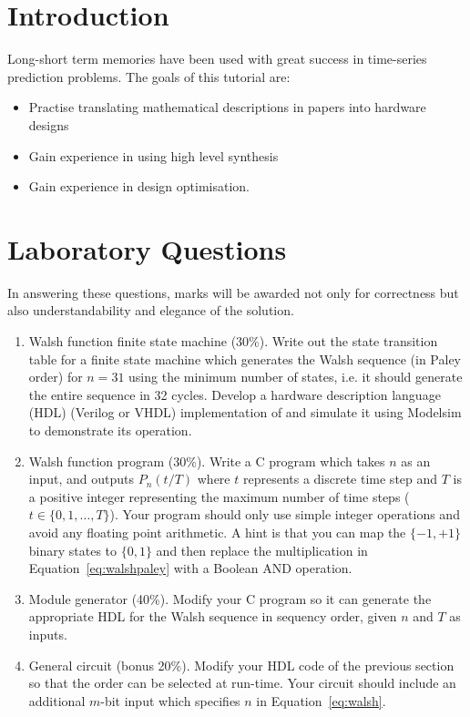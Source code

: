 
\section{Introduction}

Long-short term memories have been used with great success in time-series
prediction problems. The goals of this tutorial are:

\begin{itemize}
\item Practise translating mathematical descriptions in papers into hardware designs
\item Gain experience in using high level synthesis
\item Gain experience in design optimisation.
\end{itemize}



\section{Laboratory Questions}
In answering these questions, marks will be awarded not only for correctness
but also understandability and elegance of the solution. 

\begin{enumerate}
\item Walsh function finite state machine (30\%).
Write out the state transition table for a finite state machine
which generates the Walsh sequence (in Paley order) for $n=31$ using the minimum
number of states, i.e. it should generate the entire sequence in 32 cycles. 
Develop a hardware description language (HDL) (Verilog or VHDL) implementation of and simulate it
using Modelsim to demonstrate its operation. 
\item Walsh function program (30\%). Write a C program which takes $n$ as an
input, and outputs $P_n(t/T)$ where $t$ represents a discrete time step and $T$ is a positive integer representing the maximum number of time steps ($t \in \{0,1, \ldots, T\}$). Your program should only use simple integer operations and avoid any floating point arithmetic. A hint is that you can map
the $\{-1,+1\}$ binary states to $\{0,1\}$ and then replace the multiplication
in Equation~\ref{eq:walshpaley} with a Boolean AND operation.
\item Module generator (40\%). Modify your C program so it can generate
the appropriate HDL for the Walsh sequence in sequency order, given $n$ 
and $T$ as inputs.
\item General circuit (bonus 20\%). Modify your HDL code of the previous
section so that the order
can be selected at run-time. Your circuit should include an additional 
$m$-bit input which specifies $n$ in Equation~\ref{eq:walsh}. 
\end{enumerate}
